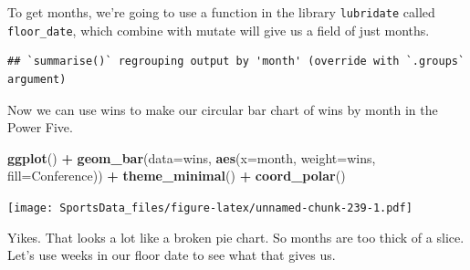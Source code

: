 \documentclass[
]{book}
\newenvironment{Shaded}{\begin{snugshade}}{\end{snugshade}}
\newcommand{\DataTypeTok}[1]{\textcolor[rgb]{0.13,0.29,0.53}{#1}}
\newcommand{\KeywordTok}[1]{\textcolor[rgb]{0.13,0.29,0.53}{\textbf{#1}}}
\newcommand{\NormalTok}[1]{#1}
\newcommand{\OperatorTok}[1]{\textcolor[rgb]{0.81,0.36,0.00}{\textbf{#1}}}
\newcommand{\StringTok}[1]{\textcolor[rgb]{0.31,0.60,0.02}{#1}}
\begin{document}
To get months, we're going to use a function in the library \texttt{lubridate} called \texttt{floor\_date}, which combine with mutate will give us a field of just months.

\begin{Shaded}
\end{Shaded}

\begin{verbatim}
## `summarise()` regrouping output by 'month' (override with `.groups` argument)
\end{verbatim}

Now we can use wins to make our circular bar chart of wins by month in the Power Five.

\begin{Shaded}
\begin{Highlighting}[]
\KeywordTok{ggplot}\NormalTok{() }\OperatorTok{+}\StringTok{ }\KeywordTok{geom_bar}\NormalTok{(}\DataTypeTok{data=}\NormalTok{wins, }\KeywordTok{aes}\NormalTok{(}\DataTypeTok{x=}\NormalTok{month, }\DataTypeTok{weight=}\NormalTok{wins, }\DataTypeTok{fill=}\NormalTok{Conference)) }\OperatorTok{+}\StringTok{ }\KeywordTok{theme_minimal}\NormalTok{() }\OperatorTok{+}\StringTok{ }\KeywordTok{coord_polar}\NormalTok{()}
\end{Highlighting}
\end{Shaded}

\texttt{[image: SportsData\_files/figure-latex/unnamed-chunk-239-1.pdf]}

Yikes. That looks a lot like a broken pie chart. So months are too thick of a slice. Let's use weeks in our floor date to see what that gives us.

\begin{Shaded}
\end{Shaded}
\end{document}
